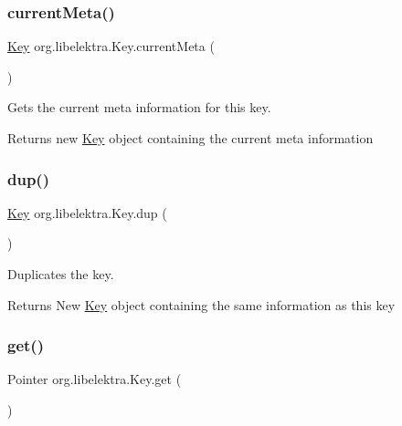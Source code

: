 \subsubsection{\texorpdfstring{currentMeta()}{currentMeta()}}
{\footnotesize\ttfamily \mbox{\hyperlink{classorg_1_1libelektra_1_1Key}{Key}} org.\+libelektra.\+Key.\+current\+Meta (\begin{DoxyParamCaption}{ }\end{DoxyParamCaption})\hspace{0.3cm}{\ttfamily [inline]}}



Gets the current meta information for this key. 

\begin{DoxyReturn}{Returns}
new \mbox{\hyperlink{classorg_1_1libelektra_1_1Key}{Key}} object containing the current meta information 
\end{DoxyReturn}
\mbox{\label{classorg_1_1libelektra_1_1Key_a67a839951aa9bc48f8ffbb1ebcdfb819}} 
\subsubsection{\texorpdfstring{dup()}{dup()}}
{\footnotesize\ttfamily \mbox{\hyperlink{classorg_1_1libelektra_1_1Key}{Key}} org.\+libelektra.\+Key.\+dup (\begin{DoxyParamCaption}{ }\end{DoxyParamCaption})\hspace{0.3cm}{\ttfamily [inline]}}



Duplicates the key. 

\begin{DoxyReturn}{Returns}
New \mbox{\hyperlink{classorg_1_1libelektra_1_1Key}{Key}} object containing the same information as this key 
\end{DoxyReturn}
\mbox{\label{classorg_1_1libelektra_1_1Key_a3c65267ac3d24c3eae35db576414fe4f}} 
\subsubsection{\texorpdfstring{get()}{get()}}
{\footnotesize\ttfamily Pointer org.\+libelektra.\+Key.\+get (\begin{DoxyParamCaption}{ }\end{DoxyParamCaption})\hspace{0.3cm}{\ttfamily [inline]}}



